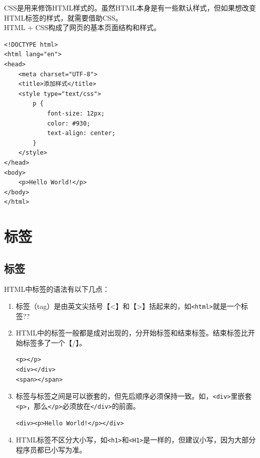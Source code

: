 CSS是用来修饰HTML样式的。虽然HTML本身是有一些默认样式，但如果想改变HTML标签的样式，就需要借助CSS。 \\

HTML + CSS构成了网页的基本页面结构和样式。

\begin{lstlisting}[style=htmlcssjs, title=添加样式]
<!DOCTYPE html>
<html lang="en">
<head>
    <meta charset="UTF-8">
    <title>添加样式</title>
    <style type="text/css">
        p {
            font-size: 12px;
            color: #930;
            text-align: center;
        }
    </style>
</head>
<body>
    <p>Hello World!</p>
</body>
</html>
\end{lstlisting}

\newpage

\section{标签}

\subsection{标签}

HTML中标签的语法有以下几点：

\begin{enumerate}
	\item 标签（tag）是由英文尖括号【<】和【>】括起来的，如\lstinline|<html>|就是一个标签??

	\item HTML中的标签一般都是成对出现的，分开始标签和结束标签。结束标签比开始标签多了一个【/】。 \\
	      \begin{lstlisting}[style=htmlcssjs]
<p></p>
<div></div>
<span></span>
    \end{lstlisting}

	\item 标签与标签之间是可以嵌套的，但先后顺序必须保持一致。如，\lstinline|<div>|里嵌套\lstinline|<p>|，那么\lstinline|</p>|必须放在\lstinline|</div>|的前面。 \\
	      \begin{lstlisting}[style=htmlcssjs]
<div><p>Hello World!</p></div>
    \end{lstlisting}

	\item HTML标签不区分大小写，如\lstinline|<h1>|和\lstinline|<H1>|是一样的，但建议小写，因为大部分程序员都已小写为准。
\end{enumerate}

